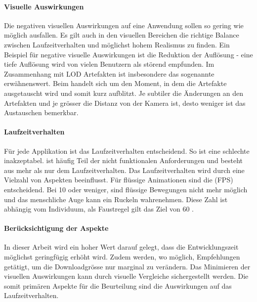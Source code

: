 \paragraph{Visuelle Auswirkungen}

Die negativen visuellen Auswirkungen auf eine Anwendung sollen so gering wie möglich ausfallen. Es gilt auch in den visuellen Bereichen die richtige Balance zwischen Laufzeitverhalten und möglichst hohem Realismus zu finden. Ein Beispiel für negative visuelle Auswirkungen ist die Reduktion der Auflösung - eine tiefe Auflösung wird von vielen Benutzern als störend empfunden. Im Zusammenhang mit LOD Artefakten ist insbesondere das sogenannte  erwähnenswert.
Beim  handelt sich um den Moment, in dem die Artefakte ausgetauscht wird und somit kurz aufblitzt. Je subtiler die Änderungen an den Artefakten und je grösser die Distanz von der Kamera ist, desto weniger ist das Austauschen bemerkbar.

\paragraph{Laufzeitverhalten}

Für jede Applikation ist das Laufzeitverhalten entscheidend. So ist eine schlechte  inakzeptabel.  ist häufig Teil der nicht funktionalen Anforderungen und besteht aus mehr als nur dem Laufzeitverhalten.
Das Laufzeitverhalten wird durch eine Vielzahl von Aspekten beeinflusst.
Für flüssige Animationen sind die  (FPS) entscheidend. Bei 10  oder weniger, sind flüssige Bewegungen nicht mehr möglich und das menschliche Auge kann ein Ruckeln wahrenehmen. Diese Zahl ist abhängig vom Individuum, als Faustregel gilt das Ziel von 60  \cite{limitsOfHumanVision}.

\paragraph{Berücksichtigung der Aspekte}
In dieser Arbeit wird ein hoher Wert darauf gelegt, dass die Entwicklungszeit möglichst geringfügig erhöht wird. Zudem werden, wo möglich, Empfehlungen getätigt, um die Downloadgrösse nur marginal zu verändern. Das Minimieren der visuellen Auswirkungen kann durch visuelle Vergleiche sichergestellt werden.
Die somit primären Aspekte für die Beurteilung sind die Auswirkungen auf das Laufzeitverhalten.

